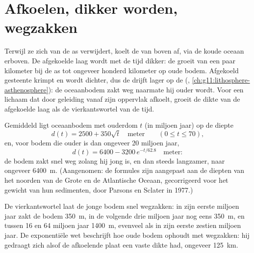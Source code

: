 \section{Afkoelen, dikker worden, wegzakken}

Terwijl ze zich van de as verwijdert, koelt de  van boven af, via de
koude oceaan erboven. De afgekoelde laag wordt met de tijd dikker: de
 groeit van een paar kilometer bij de as tot ongeveer honderd
kilometer op oude bodem. Afgekoeld gesteente krimpt en wordt dichter, dus de
 drijft lager op de  (,
\cref{ch:g11:lithosphere-asthenosphere}): de oceaanbodem zakt weg naarmate hij ouder wordt.
Voor een lichaam dat door geleiding vanaf zijn oppervlak afkoelt, groeit de dikte van de
afgekoelde laag als de vierkantswortel van de tijd.

\begin{proposition}\label{prop:g11:ocean-ridges:depth-age}
Gemiddeld ligt oceaanbodem met ouderdom $t$ (in miljoen jaar) op de diepte
\[
  d(t) = 2500 + 350\sqrt{t} \quad \text{meter} \qquad (0 \le t \le 70),
\]
en, voor bodem die ouder is dan ongeveer 20 miljoen jaar,
\[
  d(t) = 6400 - 3200\,e^{-t/62.8} \quad \text{meter}:
\]
de bodem zakt snel weg zolang hij jong is, en dan steeds langzamer, naar
ongeveer \qty{6400}{m}. (Aangenomen: de formules zijn aangepast aan de diepten van
het noorden van de Grote en de Atlantische Oceaan, gecorrigeerd voor het gewicht van
hun sedimenten, door Parsons en Sclater in 1977.)
\end{proposition}

De vierkantswortel laat de jonge bodem snel wegzakken: in zijn eerste miljoen jaar
zakt de bodem \qty{350}{m}, in de volgende drie miljoen jaar nog eens
\qty{350}{m}, en tussen 16 en 64 miljoen jaar \qty{1400}{m}, evenveel als
in zijn eerste zestien miljoen jaar. De exponentiële wet beschrijft hoe oude
bodem ophoudt met wegzakken: hij gedraagt zich alsof de afkoelende plaat een vaste
dikte had, ongeveer \qty{125}{km}.

